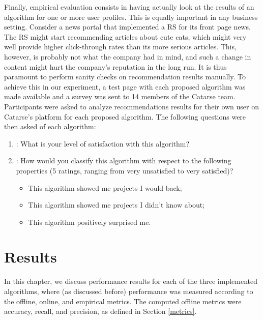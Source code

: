 \documentclass[cic,tc,english]{iiufrgs}
\newcommand{\adriano}[1]{#1}
\begin{document}
Finally, empirical evaluation consists in having actually look at the results of an algorithm for one or more user profiles. This is equally important in any business setting. Consider a news portal that implemented a RS for its front page news. The RS might start recommending articles about cute cats, which might very well provide higher click-through rates than its more serious articles. This, however, is probably not what the company had in mind, and such a change in content might hurt the company's reputation in the long run. It is thus paramount to perform sanity checks on recommendation results manually. To achieve this \adriano{in our experiment}, a test page with each proposed algorithm was made available and a survey was sent to 14 members of the Catarse team. \adriano{Participants were asked to analyze recommendations results for their own user on Catarse's platform for each proposed algorithm. The following questions were then asked of each algorithm}:

\begin{enumerate}
    \item: What is your level of satisfaction with this algorithm?
    \item: How would you classify this algorithm with respect to the following properties (5 ratings, ranging from very unsatisfied to very satisfied)?
    \begin {itemize}
    \item This algorithm showed me projects I would back;
    \item This algorithm showed me projects I didn't know about;
    \item This algorithm positively surprised me.
    \end{itemize}
\end{enumerate}




\chapter{Results} \label{results}
In this chapter, we discuss performance results for each of the three implemented algorithms, where (as discussed before) performance was measured according to the offline, online, and empirical metrics. The computed offline metrics were accuracy, recall, and precision, as defined in Section \ref{metrics}.
\end{document}
